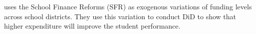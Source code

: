 \textcite{JacksonJohnsonPersico2016} uses the School Finance Reforms (SFR) as exogenous variations of funding levels across school districts.
They use this variation to conduct DiD to show that higher expenditure will improve the student performance.







\clearpage
\singlespacing
\printbibliography
% 
% 
% 

